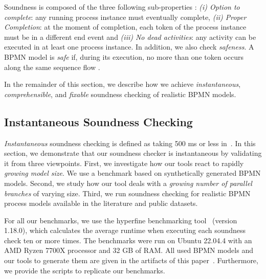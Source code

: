 \documentclass[runningheads]{llncs}
\begin{document}
Soundness is composed of the three following sub-properties \cite{corradiniClassificationBPMNCollaborations2018}:
\textit{(i) Option to complete}: any running process instance must eventually complete,
\textit{(ii) Proper Completion}: at the moment of completion, each token of the process instance must be in a different end event and
\textit{(iii) No dead activities}: any activity can be executed in at least one process instance.
In addition, we also check \textit{safeness}.
A BPMN model is \textit{safe} if, during its execution, no more than one token occurs along the same sequence flow \cite{corradiniClassificationBPMNCollaborations2018}.

In the remainder of this section, we describe how we achieve \textit{instantaneous}, \textit{comprehensible}, and \textit{fixable} soundness checking of realistic BPMN models.


\subsection{Instantaneous Soundness Checking} \label{subsec:instantaneous}
\textit{Instantaneous} soundness checking is defined as taking 500 ms or less in~\cite{fahlandAnalysisDemandInstantaneous2011}.
In this section, we demonstrate that our soundness checker is instantaneous by validating it from three viewpoints.
First, we investigate how our tools react to rapidly \textit{growing model size}.
We use a benchmark based on synthetically generated BPMN models.
Second, we study how our tool deals with a \textit{growing number of parallel branches} of varying size.
Third, we run soundness checking for realistic BPMN process models available in the literature and public datasets.

For all our benchmarks, we use the hyperfine benchmarking tool~\cite{peterHyperfine2023} (version 1.18.0), which calculates the average runtime when executing each soundness check ten or more times.
The benchmarks were run on Ubuntu 22.04.4 with an AMD Ryzen 7700X processor and 32 GB of RAM.
All used BPMN models and our tools to generate them are given in the artifacts of this paper~\cite{noauthorgivenBPM2024Artifacts2024}.
Furthermore, we provide the scripts to replicate our benchmarks.
\end{document}

